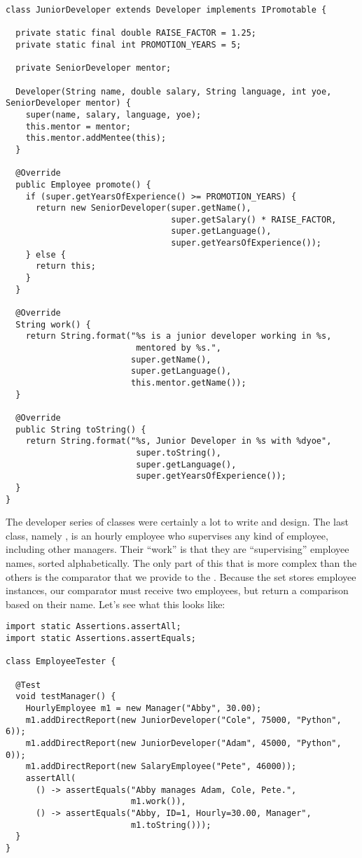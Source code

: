 \begin{lstlisting}[language=MyJava]
class JuniorDeveloper extends Developer implements IPromotable {

  private static final double RAISE_FACTOR = 1.25;
  private static final int PROMOTION_YEARS = 5;

  private SeniorDeveloper mentor;

  Developer(String name, double salary, String language, int yoe, SeniorDeveloper mentor) {
    super(name, salary, language, yoe);
    this.mentor = mentor;
    this.mentor.addMentee(this);
  }

  @Override
  public Employee promote() {
    if (super.getYearsOfExperience() >= PROMOTION_YEARS) {
      return new SeniorDeveloper(super.getName(), 
                                 super.getSalary() * RAISE_FACTOR, 
                                 super.getLanguage(), 
                                 super.getYearsOfExperience());
    } else {
      return this;
    }
  }

  @Override
  String work() {
    return String.format("%s is a junior developer working in %s, 
                          mentored by %s.", 
                         super.getName(),
                         super.getLanguage(),
                         this.mentor.getName());
  }

  @Override
  public String toString() {
    return String.format("%s, Junior Developer in %s with %dyoe", 
                          super.toString(),
                          super.getLanguage(),
                          super.getYearsOfExperience());
  }
}
\end{lstlisting}

The developer series of classes were certainly a lot to write and design. The last class, namely , is an hourly employee who supervises any kind of employee, including other managers. Their ``work'' is that they are ``supervising'' employee names, sorted alphabetically. The only part of this that is more complex than the others is the comparator that we provide to the . Because the set stores employee instances, our comparator must receive two employees, but return a comparison based on their name. Let's see what this looks like:

\begin{lstlisting}[language=MyJava]
import static Assertions.assertAll;
import static Assertions.assertEquals;

class EmployeeTester {

  @Test
  void testManager() {
    HourlyEmployee m1 = new Manager("Abby", 30.00);
    m1.addDirectReport(new JuniorDeveloper("Cole", 75000, "Python", 6));
    m1.addDirectReport(new JuniorDeveloper("Adam", 45000, "Python", 0));
    m1.addDirectReport(new SalaryEmployee("Pete", 46000));
    assertAll(
      () -> assertEquals("Abby manages Adam, Cole, Pete.", 
                         m1.work()),
      () -> assertEquals("Abby, ID=1, Hourly=30.00, Manager", 
                         m1.toString()));
  }
}
\end{lstlisting}

